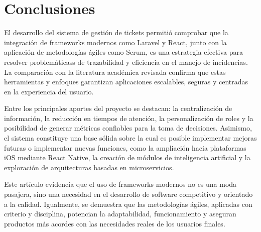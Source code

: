 \section{Conclusiones}
El desarrollo del sistema de gestión de tickets permitió comprobar que la integración de 
frameworks modernos como Laravel y React, junto con la aplicación de metodologías 
ágiles como Scrum, es una estrategia efectiva para resolver problemáticass de 
trazabilidad y eficiencia en el manejo de incidencias. La comparación con la literatura 
académica revisada confirma que estas herramientas y enfoques garantizan aplicaciones 
escalables, seguras y centradas en la experiencia del usuario. 

Entre los principales aportes del proyecto se destacan: la centralización de información, 
la reducción en tiempos de atención, la personalización de roles y la posibilidad de 
generar métricas confiables para la toma de decisiones. Asimismo, el sistema constituye 
una base sólida sobre la cual es posible implementar mejoras futuras o implementar 
nuevas funciones, como la ampliación hacia plataformas iOS mediante React Native, la 
creación de módulos de inteligencia artificial y la exploración de arquitecturas basadas en 
microservicios. 

Este artículo evidencia que el uso de frameworks modernos no es una moda pasajera, 
sino una necesidad en el desarrollo de software competitivo y orientado a la calidad. 
Igualmente, se demuestra que las metodologías ágiles, aplicadas con criterio y disciplina, 
potencian la adaptabilidad, funcionamiento y aseguran productos más acordes con las 
necesidades reales de los usuarios finales. 